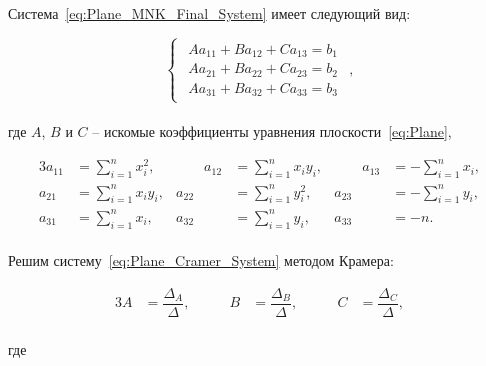 Система~\ref{eq:Plane_MNK_Final_System} имеет следующий вид:

\begin{equation}
    \label{eq:Plane_Cramer_System}
    \begin{cases}
        \begin{aligned}
            A a_{11} + B a_{12} + C a_{13} = b_1 \\
            A a_{21} + B a_{22} + C a_{23} = b_2 \\
            A a_{31} + B a_{32} + C a_{33} = b_3
        \end{aligned}
    \end{cases},
\end{equation} \\
где $A$, $B$ и $C$ -- искомые коэффициенты уравнения плоскости~\ref{eq:Plane},

\begin{alignat*}{3}
    a_{11} &= \sum_{i=1}^{n} x_i^2, & \qquad
    a_{12} &= \sum_{i=1}^{n} x_i y_i, & \qquad
    a_{13} &= - \sum_{i=1}^{n} x_i, \\
    a_{21} &= \sum_{i=1}^{n} x_i y_i, &
    a_{22} &= \sum_{i=1}^{n} y_i^2, &
    a_{23} &= - \sum_{i=1}^{n} y_i, \\
    a_{31} &= \sum_{i=1}^{n} x_i, &
    a_{32} &= \sum_{i=1}^{n} y_i, &
    a_{33} &= - n.
\end{alignat*} \\

Решим систему~\ref{eq:Plane_Cramer_System} методом Крамера:

\begin{alignat*}{3}
    A &= \dfrac{\Delta_A}{\Delta}, & \qquad
    B &= \dfrac{\Delta_B}{\Delta}, & \qquad
    C &= \dfrac{\Delta_C}{\Delta},
\end{alignat*} \\
где

